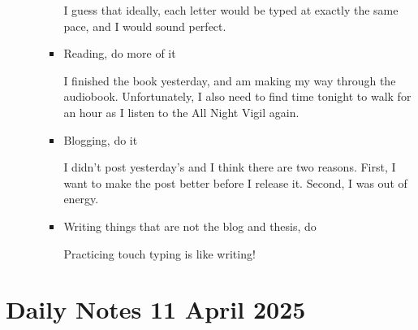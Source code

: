\documentclass[12pt]{article}
\renewcommand{\,}{\textsuperscript{,}}
\begin{document}
\begin{itemize}
\begin{itemize}
\begin{itemize}
I guess that ideally, each letter would be typed at exactly the same pace, and I would sound perfect.

\item Reading, do more of it

I finished the book yesterday, and am making my way through the audiobook.  
Unfortunately, I also need to find time tonight to walk for an hour as I listen to the All Night Vigil again.

\item Blogging, do it

I didn't post yesterday's and I think there are two reasons.  
First, I want to make the post better before I release it.  
Second, I was out of energy.

\item Writing things that are not the blog and thesis, do

Practicing touch typing is like writing!

\end{itemize}

\end{itemize}

\end{itemize}

\section{Daily Notes 11 April 2025}
\end{document}
